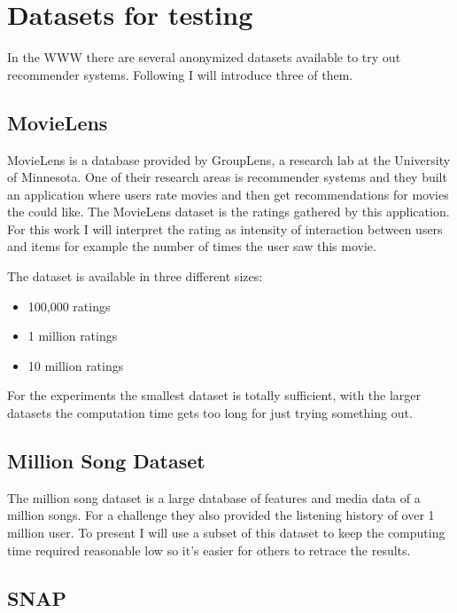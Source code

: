 \section{Datasets for testing}

In the WWW there are several anonymized datasets available to try
out recommender systems. Following I will introduce three of them.


\subsection{MovieLens}

MovieLens\cite{movielensdatasets} is a database provided by GroupLens, a research
lab at the University of Minnesota. One of their research areas is
recommender systems and they built an application where users rate
movies and then get recommendations for movies the could like. The
MovieLens dataset is the ratings gathered by this application. For
this work I will interpret the rating as intensity of interaction
between users and items for example the number of times the user saw
this movie.

The dataset is available in three different sizes:
\begin{itemize}
\item 100,000 ratings
\item 1 million ratings
\item 10 million ratings
\end{itemize}
For the experiments the smallest dataset is totally sufficient, with
the larger datasets the computation time gets too long for just trying
something out.


\subsection{Million Song Dataset}
The million song dataset\cite{Bertin-Mahieux2011} is a large database of features and media data
of a million songs. For a challenge they also provided the listening history of over 1 million
user. To present I will use a subset of this dataset to keep the computing time required
reasonable low so it's easier for others to retrace the results.


\subsection{SNAP}
